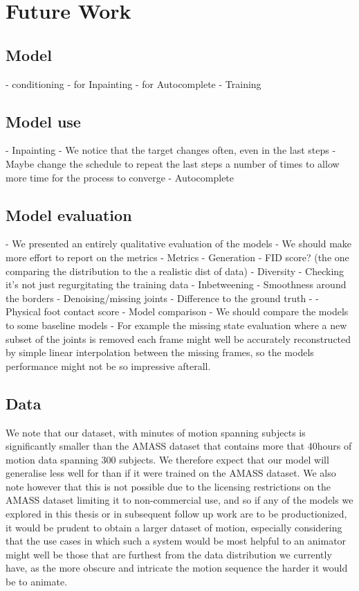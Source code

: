 \section{Future Work}
\label{sec:future_work}

\subsection{Model}
- conditioning
    - for Inpainting
    - for Autocomplete
- Training


\subsection{Model use}
- Inpainting
    - We notice that the target changes often, even in the last steps
    - Maybe change the schedule to repeat the last steps a number of times to allow more time for the process to converge
- Autocomplete

\subsection{Model evaluation}
- We presented an entirely qualitative evaluation of the models
    - We should make more effort to report on the metrics
    - Metrics
        - Generation
            - FID score? (the one comparing the distribution to the a realistic dist of data)
            - Diversity
            - Checking it's not just regurgitating the training data
        - Inbetweening
            - Smoothness around the borders
        - Denoising/missing joints
            - Difference to the ground truth
        - \cite{EDGE}
            - Physical foot contact score
- Model comparison
    - We should compare the models to some baseline models
        - For example the missing state evaluation where a new subset of the joints is removed each frame might well be accurately reconstructed by simple linear interpolation between the missing frames, so the models performance might not be so impressive afterall.

            
\subsection{Data}
We note that our dataset, with  minutes of motion spanning  subjects is significantly smaller than the AMASS \cite{amass} dataset that contains more that 40hours of motion data spanning 300 subjects. We therefore expect that our model will generalise less well for than if it were trained on the AMASS dataset. We also note however that this is not possible due to the licensing restrictions on the AMASS dataset limiting it to non-commercial use, and so if any of the models we explored in this thesis or in subsequent follow up work are to be productionized, it would be prudent to obtain a larger dataset of motion, especially considering that the use cases in which such a system would be most helpful to an animator might well be those that are furthest from the data distribution we currently have, as the more obscure and intricate the motion sequence the harder it would be to animate.